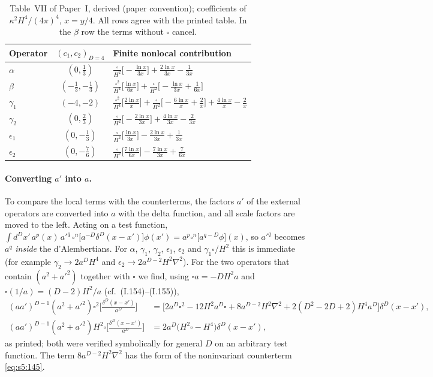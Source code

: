 \documentclass[aps,prd,onecolumn,10pt,nofootinbib,floatfix]{revtex4-2}
\newcommand{\PI}{Paper~I}
\newcommand{\eqI}[1]{(I.#1)}
\begin{document}
\begin{table}[tb]
\caption{Table~VII of \PI, derived (paper convention); coefficients of $\kappa^2H^4/(4\pi)^4$, $x=y/4$. All rows agree with the printed table. In the $\beta$ row the terms without $\square$ cancel.}
\label{tab:s5:T7}
\renewcommand{\arraystretch}{1.5}
\begin{ruledtabular}
\begin{tabular}{lcl}
Operator & $(c_1,c_2)_{D=4}$ & Finite nonlocal contribution\\
\hline
$\alpha$ & $(0,\tfrac13)$ & $\frac{\square}{H^2}\big[-\frac{\ln x}{3x}\big]+\frac{2\ln x}{3x}-\frac1{3x}$\\
$\beta$ & $(-\tfrac13,-\tfrac13)$ & $\frac{\square^2}{H^4}\big[\frac{\ln x}{6x}\big]+\frac{\square}{H^2}\big[-\frac{\ln x}{3x}+\frac1{6x}\big]$\\
$\gamma_1$ & $(-4,-2)$ & $\frac{\square^2}{H^4}\big[\frac{2\ln x}{x}\big]+\frac{\square}{H^2}\big[-\frac{6\ln x}{x}+\frac2x\big]+\frac{4\ln x}{x}-\frac2x$\\
$\gamma_2$ & $(0,\tfrac23)$ & $\frac{\square}{H^2}\big[-\frac{2\ln x}{3x}\big]+\frac{4\ln x}{3x}-\frac2{3x}$\\
$\epsilon_1$ & $(0,-\tfrac13)$ & $\frac{\square}{H^2}\big[\frac{\ln x}{3x}\big]-\frac{2\ln x}{3x}+\frac1{3x}$\\
$\epsilon_2$ & $(0,-\tfrac76)$ & $\frac{\square}{H^2}\big[\frac{7\ln x}{6x}\big]-\frac{7\ln x}{3x}+\frac7{6x}$\\
\end{tabular}
\end{ruledtabular}
\end{table}

\paragraph*{Converting $a'$ into $a$.}
To compare the local terms with the counterterms, the factors $a'$ of the external operators are converted into $a$ with the delta function, and all scale factors are moved to the left.
Acting on a test function,
$\int d^Dx'\,a^p(x)\,a'^q\,\square^n\big[a^{-D}\delta^D(x-x')\big]\phi(x')=a^p\square^n\big[a^{q-D}\phi\big](x)$,
so $a'^q$ becomes $a^q$ \emph{inside} the d'Alembertians.
For $\alpha$, $\gamma_1$, $\gamma_2$, $\epsilon_1$, $\epsilon_2$ and $\gamma_1\square/H^2$ this is immediate (for example $\gamma_2\to2a^DH^4$ and $\epsilon_2\to2a^{D-2}H^2\nabla^2$).
For the two operators that contain $(a^2+a'^2)$ together with $\square$ we find, using $\square a=-DH^2a$ and $\square(1/a)=(D-2)H^2/a$ (cf.\ \eqI{154}--\eqI{155}),
\begin{align}
(aa')^{D-1}(a^2+a'^2)\square^2\Big[\frac{\delta^D(x-x')}{a^D}\Big]&=\big[2a^D\square^2-12H^2a^D\square+8a^{D-2}H^2\nabla^2+2(D^2-2D+2)H^4a^D\big]\delta^D(x-x'),
\label{eq:s5:154}\\
(aa')^{D-1}(a^2+a'^2)H^2\square\Big[\frac{\delta^D(x-x')}{a^D}\Big]&=2a^D\big(H^2\square-H^4\big)\delta^D(x-x'),
\label{eq:s5:155}
\end{align}
as printed; both were verified symbolically for general $D$ on an arbitrary test function.
The term $8a^{D-2}H^2\nabla^2$ has the form of the noninvariant counterterm \eqref{eq:s5:145}.
\end{document}
